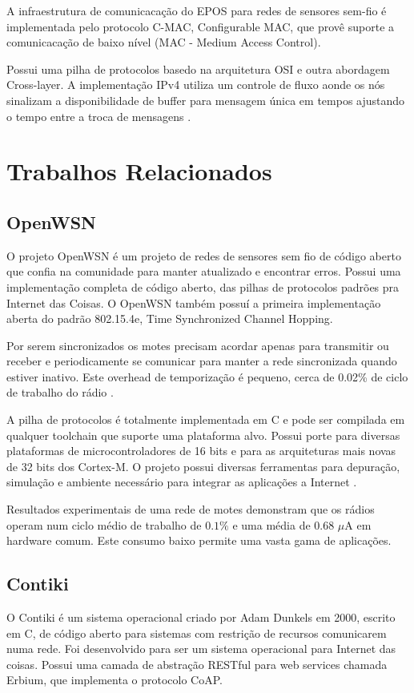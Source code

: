A infraestrutura de comunicaca\c{c}\~ao do EPOS para redes de sensores sem-fio \'e implementada pelo protocolo C-MAC, Configurable MAC, que prov\^e suporte a comunicaca\c{c}\~ao de baixo n\'ivel (MAC - Medium Access Control).

Possui uma pilha de protocolos basedo na arquitetura OSI e outra abordagem Cross-layer. A implementa\c{c}\~ao IPv4 utiliza um controle de fluxo aonde os n\'os sinalizam a disponibilidade de buffer para mensagem \'unica em tempos ajustando o tempo entre a troca de mensagens \cite{frohlich2013cross}.


\section{Trabalhos Relacionados}

\subsection{OpenWSN}

O projeto OpenWSN \'e um projeto de redes de sensores sem fio de c\'odigo aberto que confia na comunidade para manter atualizado e encontrar erros. Possui uma implementa\c{c}\~ao completa de c\'odigo aberto, das pilhas de protocolos padr\~oes pra Internet das Coisas. O OpenWSN tamb\'em possu\'i a primeira implementa\c{c}\~ao aberta do padr\~ao 802.15.4e, Time Synchronized Channel Hopping.

Por serem sincronizados os motes precisam acordar apenas para transmitir ou receber e periodicamente se comunicar para manter a rede sincronizada quando estiver inativo. Este overhead de temporiza\c{c}\~ao \'e pequeno, cerca de 0.02\% de ciclo de trabalho do r\'adio \cite{openWSNPaper}.

A pilha de protocolos \'e totalmente implementada em C e pode ser compilada em qualquer toolchain que suporte uma plataforma alvo. Possui porte para diversas plataformas de microcontroladores de 16 bits e para as arquiteturas mais novas de 32 bits dos Cortex-M. O projeto possui diversas ferramentas para depura\c{c}\~ao, simula\c{c}\~ao e ambiente necess\'ario para integrar as aplica\c{c}\~oes a Internet \cite{openWSN}.

Resultados experimentais de uma rede de motes demonstram que os r\'adios operam num ciclo m\'edio de trabalho de $0.1\%$ e uma m\'edia de 0.68 $\mu$A em hardware comum. Este consumo baixo permite uma vasta gama de aplica\c{c}\~oes.

\subsection{Contiki}
O Contiki \'e um sistema operacional criado por Adam Dunkels em 2000, escrito em C, de c\'odigo aberto para sistemas com restri\c{c}\~ao de recursos comunicarem numa rede. Foi desenvolvido para ser um sistema operacional para Internet das coisas. Possui uma camada de abstra\c{c}\~ao RESTful para web services chamada Erbium, que implementa o protocolo CoAP.

